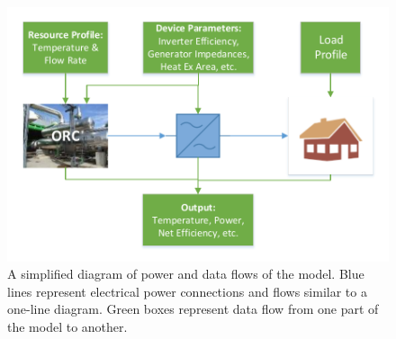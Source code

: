 \begin{figure}[h]
	\centering
	\caption{A simplified diagram of power and data flows of the model. Blue lines represent electrical power connections and flows similar to a one-line diagram. Green boxes represent data flow from one part of the model to another.}
	\label{fig:abridged_flow_diagram_label}
	
	\includegraphics[width=\textwidth]{figures/Abridged Pilgrim Model Flow diagram - AC bus.pdf} 

\end{figure}